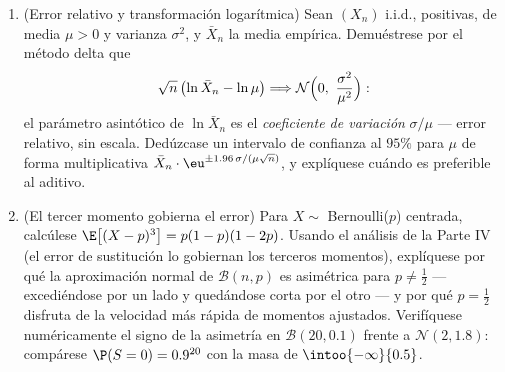 \begin{problem}
\begin{enumerate}[resume]
  \item (Error relativo y transformación logarítmica) Sean $(X_n)$
  i.i.d., positivas, de media $\mu > 0$ y varianza $\sigma^2$, y
  $\bar X_n$ la media empírica. Demuéstrese por el método delta que
        \[
        \sqrt n\,\bigl(\ln\bar X_n - \ln\mu\bigr)
        \Longrightarrow
        \mathcal N\Bigl(0,\ \frac{\sigma^2}{\mu^2}\Bigr) :
        \]
        el parámetro asintótico de $\ln\bar X_n$ es el \emph{coeficiente
        de variación} $\sigma/\mu$ --- error relativo, sin escala.
        Dedúzcase un intervalo de confianza al $95\%$ para $\mu$ de
        forma multiplicativa
        $\bar X_n\cdot\eu^{\pm1.96\,\sigma/(\mu\sqrt
        n)}$, y explíquese cuándo es preferible al aditivo. \item (El
        tercer momento gobierna el error) Para $X \sim$ Bernoulli($p$)
        centrada, calcúlese $\E\bigl[(X -
        p)^3\bigr] = p(1-p)(1-2p)$. Usando el análisis de la Parte IV
        (el error de sustitución lo gobiernan los terceros momentos),
        explíquese por qué la aproximación normal de $\mathcal B(n, p)$
        es asimétrica para $p \neq \frac12$ --- excediéndose por un lado
        y quedándose corta por el otro --- y por qué $p = \frac12$
        disfruta de la velocidad más rápida de momentos ajustados.
        Verifíquese numéricamente el signo de la asimetría en $\mathcal
        B(20, 0.1)$ frente a $\mathcal N(2, 1.8)$: compárese
        $\P(S = 0) = 0.9^{20}$ con la masa
         de
        $\intoo{-\infty}{0.5}$.
\end{enumerate}
\end{problem}
